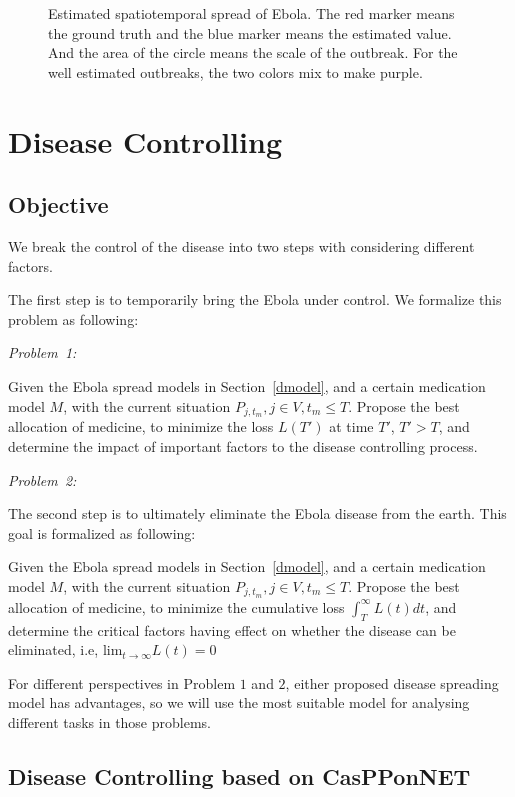 \documentclass[11pt]{article}
\begin{document}
\begin{figure}[hbtp]
\begin{center}
  \caption{Estimated spatiotemporal spread of Ebola. The red marker means the ground truth and the blue marker means the estimated value. And the area of the circle means the scale of the outbreak. For the well estimated outbreaks, the two colors mix to make purple.}
  \label{espread}
\end{center}  
\end{figure}


\section{Disease Controlling}

\subsection{Objective}
We break the control of the disease into two steps with considering different factors. 

The first step is to temporarily bring the Ebola under control. We formalize this problem as following:

\emph{Problem~1:}

Given the Ebola spread models in Section~\ref{dmodel}, and a certain medication model $M$, with the current situation $P_{j,t_m}, j \in V, t_m \leq T$. Propose the best allocation of medicine, to minimize the loss $L(T')$ at time $T'$, $T' > T$, and determine the impact of important factors to the disease controlling process.


\emph{Problem~2:}

The second step is to ultimately eliminate the Ebola disease from the earth. This goal is formalized as following:

Given the Ebola spread models in Section~\ref{dmodel}, and a certain medication model $M$, with the current situation $P_{j,t_m}, j \in V, t_m \leq T$. Propose the best allocation of medicine, to minimize the cumulative loss $\int_{T}^{\infty} L(t) dt $, and determine the critical factors having effect on whether   the disease can be eliminated, i.e, $\text{lim}_{t\rightarrow \infty} L(t) = 0 $

For different perspectives in Problem $1$ and $2$, either proposed disease spreading model has advantages, so we will use the most suitable model for  analysing different tasks in those problems.


\subsection{Disease Controlling based on CasPPonNET}
\end{document}
